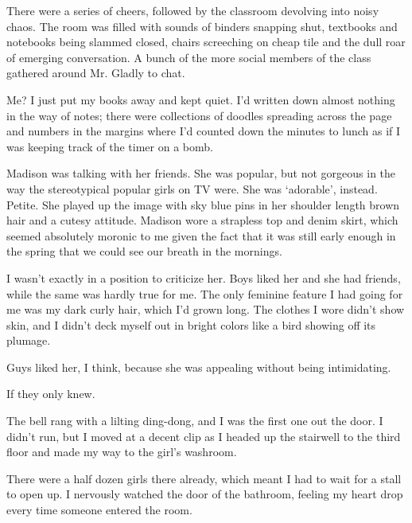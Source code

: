 There were a series of cheers, followed by the classroom devolving into noisy chaos.  The room was filled with sounds of binders snapping shut, textbooks and notebooks being slammed closed, chairs screeching on cheap tile and the dull roar of emerging conversation.  A bunch of the more social members of the class gathered around Mr. Gladly to chat.



Me?  I just put my books away and kept quiet.  I'd written down almost nothing in the way of notes; there were collections of doodles spreading across the page and numbers in the margins where I'd counted down the minutes to lunch as if I was keeping track of the timer on a bomb.



Madison was talking with her friends.  She was popular, but not gorgeous in the way the stereotypical popular girls on TV were.  She was `adorable', instead.  Petite.  She played up the image with sky blue pins in her shoulder length brown hair and a cutesy attitude. Madison wore a strapless top and denim skirt, which seemed absolutely moronic to me given the fact that it was still early enough in the spring that we could see our breath in the mornings.



I wasn't exactly in a position to criticize her.  Boys liked her and she had friends, while the same was hardly true for me.  The only feminine feature I had going for me was my dark curly hair, which I'd grown long.  The clothes I wore didn't show skin, and I didn't deck myself out in bright colors like a bird showing off its plumage.



Guys liked her, I think, because she was appealing without being intimidating.



If they only knew.



The bell rang with a lilting ding-dong, and I was the first one out the door.  I didn't run, but I moved at a decent clip as I headed up the stairwell to the third floor and made my way to the girl's washroom.



There were a half dozen girls there already, which meant I had to wait for a stall to open up.  I nervously watched the door of the bathroom, feeling my heart drop every time someone entered the room.




